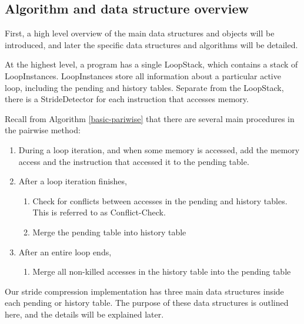 \documentclass[12pt,twoside]{reedthesis}
\begin{document}
		\subsection{Algorithm and data structure overview}
		
			
			First, a high level overview of the main data structures and objects will be introduced, and later the specific data structures and algorithms will be detailed. 
			
			At the highest level, a program has a single LoopStack, which contains a stack of LoopInstances. LoopInstances store all information about a particular active loop, including the pending and history tables.	Separate from the LoopStack, there is a StrideDetector for each instruction that accesses memory. 
			
			Recall from Algorithm \ref{basic-pariwise} that there are several main procedures in the pairwise method:
			
			\begin{enumerate}
				\item During a loop iteration, and when some memory is accessed, add the memory access and the instruction that accessed it to the pending table. 
				\item After a loop iteration finishes,
				\begin{enumerate}
					\item Check for conflicts between accesses in the pending and history tables. This is referred to as Conflict-Check.
					\item Merge the pending table into history table
				\end{enumerate}
				\item After an entire loop ends,
				\begin{enumerate}
					\item Merge all non-killed accesses in the history table into the pending table 
				\end{enumerate}
			\end{enumerate}
			
			Our stride compression implementation has three main data structures inside each pending or history table. The purpose of these data structures is outlined here, and the details will be explained later. 
			
\end{document}
